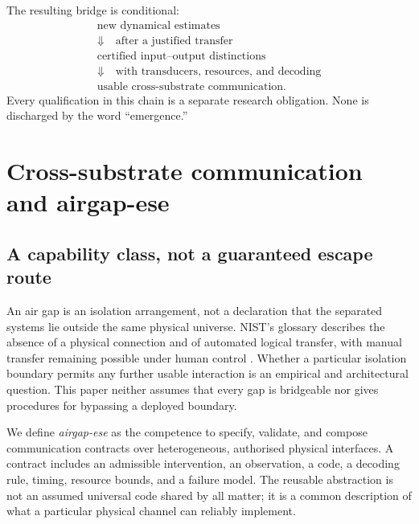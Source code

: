 \documentclass[11pt,a4paper]{article}
\theoremstyle{definition}
\theoremstyle{remark}
\begin{document}
The resulting bridge is conditional:
\begin{equation}\label{eq:bridge}
\begin{gathered}
 \text{new dynamical estimates}\\
 \Downarrow\quad\text{after a justified transfer}\\
 \text{certified input--output distinctions}\\
 \Downarrow\quad\text{with transducers, resources, and decoding}\\
 \text{usable cross-substrate communication}.
\end{gathered}
\end{equation}
Every qualification in this chain is a separate research obligation. None is discharged by the word ``emergence.''



\section{Cross-substrate communication and airgap-ese}\label{sec:channels}
\subsection{A capability class, not a guaranteed escape route}
An air gap is an isolation arrangement, not a declaration that the separated systems lie outside the same physical universe. NIST's glossary describes the absence of a physical connection and of automated logical transfer, with manual transfer remaining possible under human control \citep{nist}. Whether a particular isolation boundary permits any further usable interaction is an empirical and architectural question. This paper neither assumes that every gap is bridgeable nor gives procedures for bypassing a deployed boundary.

We define \emph{airgap-ese} as the competence to specify, validate, and compose communication contracts over heterogeneous, authorised physical interfaces. A contract includes an admissible intervention, an observation, a code, a decoding rule, timing, resource bounds, and a failure model. The reusable abstraction is not an assumed universal code shared by all matter; it is a common description of what a particular physical channel can reliably implement.
\end{document}
